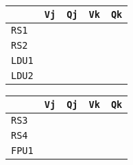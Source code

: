 \begin{enumerate}
    \begin{minipage}{0.45\textwidth}
        \centering
        \begin{tabular}{@{} l | l l l l @{}}
            \toprule
                & \texttt{Vj} & \texttt{Qj} & \texttt{Vk} & \texttt{Qk} \\
            \midrule
            \texttt{RS1} & & & & \\ [.3em]
            \texttt{RS2} & & & & \\
            \cmidrule{1-5}
            \texttt{LDU1} & & & & \\ [.3em]
            \texttt{LDU2} & & & & \\
            \bottomrule
        \end{tabular}
    \end{minipage}
    \hfill
    \begin{minipage}{0.45\textwidth}
        \centering
        \begin{tabular}{@{} l | l l l l @{}}
            \toprule
            & \texttt{Vj} & \texttt{Qj} & \texttt{Vk} & \texttt{Qk} \\
            \midrule
            \texttt{RS3} & & & & \\ [.3em]
            \texttt{RS4} & & & & \\
            \cmidrule{1-5}
            \texttt{FPU1} & & & & \\
            \bottomrule
        \end{tabular}
    \end{minipage}


\end{enumerate}
